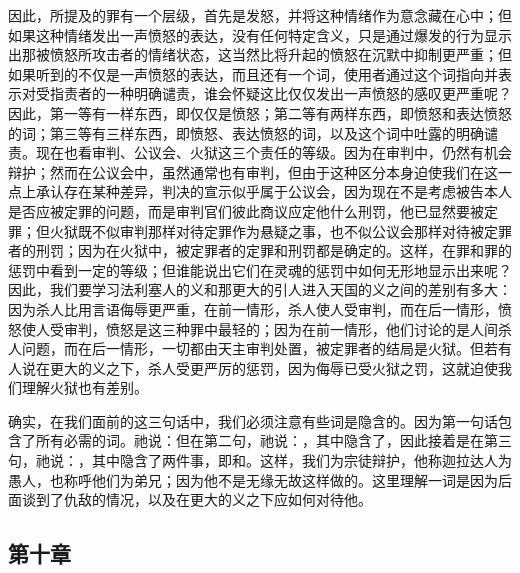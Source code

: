 因此，所提及的罪有一个层级，首先是发怒，并将这种情绪作为意念藏在心中；但如果这种情绪发出一声愤怒的表达，没有任何特定含义，只是通过爆发的行为显示出那被愤怒所攻击者的情绪状态，这当然比将升起的愤怒在沉默中抑制更严重；但如果听到的不仅是一声愤怒的表达，而且还有一个词，使用者通过这个词指向并表示对受指责者的一种明确谴责，谁会怀疑这比仅仅发出一声愤怒的感叹更严重呢？因此，第一等有一样东西，即仅仅是愤怒；第二等有两样东西，即愤怒和表达愤怒的词；第三等有三样东西，即愤怒、表达愤怒的词，以及这个词中吐露的明确谴责。现在也看审判、公议会、火狱这三个责任的等级。因为在审判中，仍然有机会辩护；然而在公议会中，虽然通常也有审判，但由于这种区分本身迫使我们在这一点上承认存在某种差异，判决的宣示似乎属于公议会，因为现在不是考虑被告本人是否应被定罪的问题，而是审判官们彼此商议应定他什么刑罚，他已显然要被定罪；但火狱既不似审判那样对待定罪作为悬疑之事，也不似公议会那样对待被定罪者的刑罚；因为在火狱中，被定罪者的定罪和刑罚都是确定的。这样，在罪和罪的惩罚中看到一定的等级；但谁能说出它们在灵魂的惩罚中如何无形地显示出来呢？因此，我们要学习法利塞人的义和那更大的引人进入天国的义之间的差别有多大：因为杀人比用言语侮辱更严重，在前一情形，杀人使人受审判，而在后一情形，愤怒使人受审判，愤怒是这三种罪中最轻的；因为在前一情形，他们讨论的是人间杀人问题，而在后一情形，一切都由天主审判处置，被定罪者的结局是火狱。但若有人说在更大的义之下，杀人受更严厉的惩罚，因为侮辱已受火狱之罚，这就迫使我们理解火狱也有差别。\par

确实，在我们面前的这三句话中，我们必须注意有些词是隐含的。因为第一句话包含了所有必需的词。祂说：但在第二句，祂说：，其中隐含了，因此接着是在第三句，祂说：，其中隐含了两件事，即和。这样，我们为宗徒辩护，他称迦拉达人为愚人，也称呼他们为弟兄；因为他不是无缘无故这样做的。这里理解一词是因为后面谈到了仇敌的情况，以及在更大的义之下应如何对待他。\par


\subsection{第十章}

